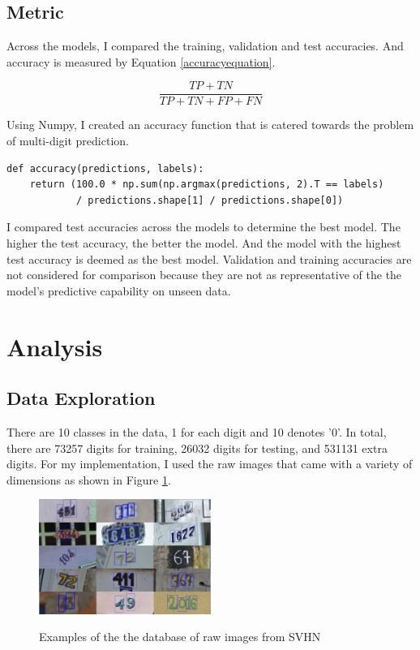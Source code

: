 \documentclass[twoside, column]{article}
\begin{document}

\subsection{Metric}

Across the models, I compared the training, validation and test accuracies. And accuracy is measured by Equation \ref{accuracyequation}.

\begin{equation} \label{accuracyequation}
\frac{TP + TN}{TP + TN + FP + FN}
\end{equation}

Using Numpy, I created an accuracy function that is catered towards the problem of multi-digit prediction. 

\begin{verbatim}
def accuracy(predictions, labels):
    return (100.0 * np.sum(np.argmax(predictions, 2).T == labels)
            / predictions.shape[1] / predictions.shape[0])      
 \end{verbatim}
 
 I compared test accuracies across the models to determine the best model. The higher the test accuracy, the better the model. And the model with the highest test accuracy is deemed as the best model. Validation and training accuracies are not considered for comparison because they are not as representative of the the model's predictive capability on unseen data. 
 

\section{Analysis}

\subsection{Data Exploration}

There are 10 classes in the data, 1 for each digit and 10 denotes '0'. In total, there are 73257 digits for training, 26032 digits for testing, and 531131 extra digits. For my implementation, I used the raw images that came with a variety of dimensions as shown in Figure \ref{rawimages}.

\begin{figure}[h]
\caption{Examples of the the database of raw images from SVHN}
\centering
\includegraphics[width=0.5\textwidth]{original_photos}
\label{rawimages}
\end{figure}
\end{document}

